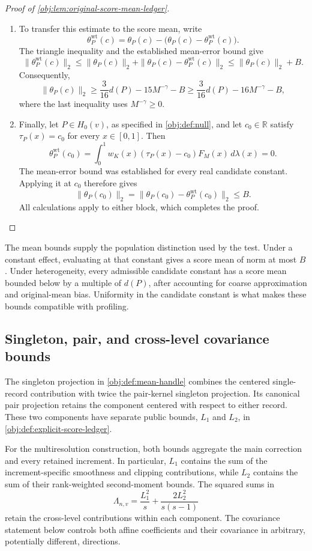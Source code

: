 \documentclass[11pt]{article}
\begin{document}
\begin{proof}[Proof of \cref{obj:lem:original-score-mean-ledger}]
\begin{enumerate}
\item
To transfer this estimate to the score mean, write
\[
\theta^{\mathrm{wt}}_P(c)
=
\theta_P(c)-\bigl(\theta_P(c)-\theta^{\mathrm{wt}}_P(c)\bigr).
\]
The triangle inequality and the established mean-error bound give
\[
\|\theta^{\mathrm{wt}}_P(c)\|_2
\le
\|\theta_P(c)\|_2
+\|\theta_P(c)-\theta^{\mathrm{wt}}_P(c)\|_2
\le
\|\theta_P(c)\|_2+B.
\]
Consequently,
\[
\|\theta_P(c)\|_2
\ge\frac3{16}d(P)-15M^{-\gamma}-B
\ge\frac3{16}d(P)-16M^{-\gamma}-B,
\]
where the last inequality uses \(M^{-\gamma}\ge0\).

\item
Finally, let \(P\in H_0(v)\), as specified in
\cref{obj:def:null}, and let \(c_0\in\mathbb R\) satisfy
\(\tau_P(x)=c_0\) for every \(x\in[0,1]\). Then
\[
\theta^{\mathrm{wt}}_P(c_0)
=
\int_0^1w_K(x)(\tau_P(x)-c_0)F_M(x)\,d\lambda(x)
=0.
\]
The mean-error bound was established for every real candidate constant. Applying it at \(c_0\) therefore gives
\[
\|\theta_P(c_0)\|_2
=
\|\theta_P(c_0)-\theta^{\mathrm{wt}}_P(c_0)\|_2
\le B.
\]
All calculations apply to either block, which completes the proof.
\end{enumerate}
\end{proof}

The mean bounds supply the population distinction used by the test. Under a constant effect, evaluating at that constant gives a score mean of norm at most \(B\). Under heterogeneity, every admissible candidate constant has a score mean bounded below by a multiple of \(d(P)\), after accounting for coarse approximation and original-mean bias. Uniformity in the candidate constant is what makes these bounds compatible with profiling.

\subsection{Singleton, pair, and cross-level covariance bounds}

The singleton projection in \cref{obj:def:mean-handle} combines the centered single-record contribution with twice the pair-kernel singleton projection. Its canonical pair projection retains the component centered with respect to either record. These two components have separate public bounds, \(L_1\) and \(L_2\), in \cref{obj:def:explicit-score-ledger}.

For the multiresolution construction, both bounds aggregate the main correction and every retained increment. In particular, \(L_1\) contains the sum of the increment-specific smoothness and clipping contributions, while \(L_2\) contains the sum of their rank-weighted second-moment bounds. The squared sums in
\[
\Lambda_{n,v}
=\frac{L_1^2}{s}
+\frac{2L_2^2}{s(s-1)}
\]
retain the cross-level contributions within each component. The covariance statement below controls both affine coefficients and their covariance in arbitrary, potentially different, directions.
\end{document}

